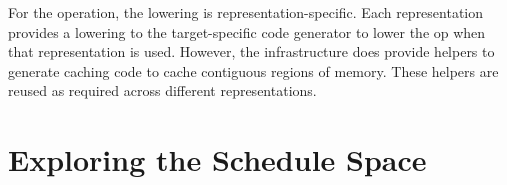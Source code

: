 For the  operation, the lowering is representation-specific. Each representation
provides a lowering to the target-specific code generator to lower the  op when
that representation is used. However, the \Treebeard{} infrastructure does provide helpers 
to generate caching code to cache contiguous regions of memory. These helpers are reused 
as required across different representations. 

\section{Exploring the Schedule Space}
